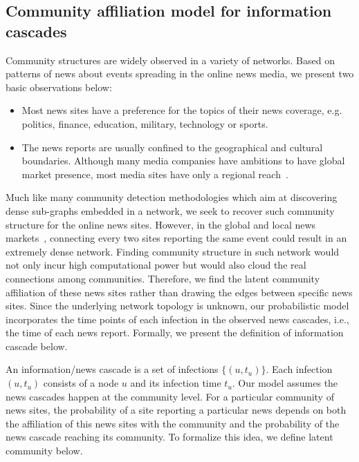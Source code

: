 \subsection{Community affiliation model for information cascades}
Community structures are widely observed in a variety of networks. Based on patterns of news about events spreading in the online news media, we present two basic observations below: 
\begin{itemize}
    \item Most news sites have a preference for the topics of their news coverage, e.g. politics, finance, education, military, technology or sports.
    \item The news reports are usually confined to the geographical and cultural boundaries. Although many media companies have ambitions to have global market presence, most media sites have only a regional reach~\cite{hjarvard2001news}.
\end{itemize}

Much like many community detection methodologies \cite{blondel2008fast,clauset2004finding,lu2017adaptive,xie2011community,fortunato2010community} which aim at discovering dense sub-graphs embedded in a network, we seek to recover such community structure for the online news sites. However, in the global and local news markets~\cite{leetaru2013gdelt}, connecting every two sites reporting the same event could result in an extremely dense network. Finding community structure in such network would not only incur high computational power but would also cloud the real connections among communities. Therefore, we find the latent community affiliation of these news sites rather than drawing the edges between specific news sites. Since the underlying network topology is unknown, our probabilistic model incorporates the time points of each infection in the observed news cascades, i.e., the time of each news report. Formally, we present the definition of information cascade below.

An information/news cascade is a set of infections $\{(u, t_u)\}$. Each infection $(u, t_u)$ consists of a node $u$ and its infection time $t_u$. Our model assumes the news cascades happen at the community level. For a particular community of news sites, the probability of a site reporting a particular news depends on both the affiliation of this news sites with the community and the probability of the news cascade reaching its community. To formalize this idea, we define latent community below.

